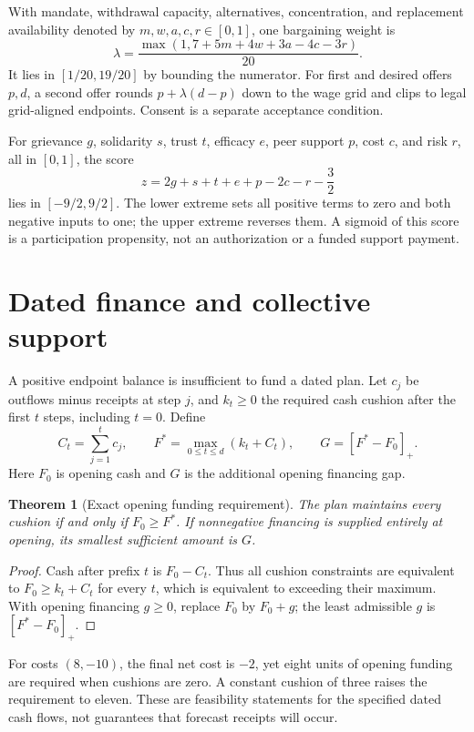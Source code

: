 \documentclass[11pt,a4paper]{article}
\newtheorem{theorem}{Theorem}[section]
\begin{document}
With mandate, withdrawal capacity, alternatives, concentration, and replacement availability denoted by $m,w,a,c,r\in[0,1]$, one bargaining weight is
\begin{equation}
\lambda=\frac{\max(1,7+5m+4w+3a-4c-3r)}{20}.
\end{equation}
It lies in $[1/20,19/20]$ by bounding the numerator. For first and desired offers $p,d$, a second offer rounds $p+\lambda(d-p)$ down to the wage grid and clips to legal grid-aligned endpoints. Consent is a separate acceptance condition.

For grievance $g$, solidarity $s$, trust $t$, efficacy $e$, peer support $p$, cost $c$, and risk $r$, all in $[0,1]$, the score
\begin{equation}
z=2g+s+t+e+p-2c-r-\frac32
\end{equation}
lies in $[-9/2,9/2]$. The lower extreme sets all positive terms to zero and both negative inputs to one; the upper extreme reverses them. A sigmoid of this score is a participation propensity, not an authorization or a funded support payment.

\section{Dated finance and collective support}
A positive endpoint balance is insufficient to fund a dated plan. Let $c_j$ be outflows minus receipts at step $j$, and $k_t\geq0$ the required cash cushion after the first $t$ steps, including $t=0$. Define
\begin{equation}
C_t=\sum_{j=1}^{t}c_j,\qquad
F^*=\max_{0\leq t\leq d}(k_t+C_t),\qquad
G=[F^*-F_0]_+.
\end{equation}
Here $F_0$ is opening cash and $G$ is the additional opening financing gap.

\begin{theorem}[Exact opening funding requirement]
The plan maintains every cushion if and only if $F_0\geq F^*$. If nonnegative financing is supplied entirely at opening, its smallest sufficient amount is $G$.
\end{theorem}
\begin{proof}
Cash after prefix $t$ is $F_0-C_t$. Thus all cushion constraints are equivalent to $F_0\geq k_t+C_t$ for every $t$, which is equivalent to exceeding their maximum. With opening financing $g\geq0$, replace $F_0$ by $F_0+g$; the least admissible $g$ is $[F^*-F_0]_+$.
\end{proof}

For costs $(8,-10)$, the final net cost is $-2$, yet eight units of opening funding are required when cushions are zero. A constant cushion of three raises the requirement to eleven. These are feasibility statements for the specified dated cash flows, not guarantees that forecast receipts will occur.
\end{document}

